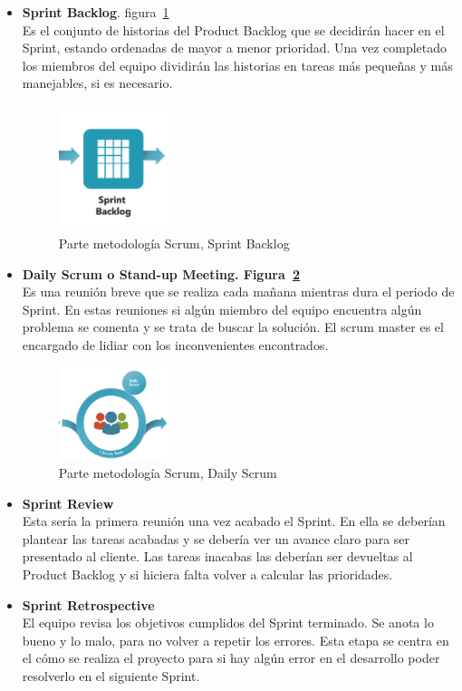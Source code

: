 \begin{itemize}
\item \textbf{Sprint Backlog}. figura~\ref{fig:sprint}\\
Es el conjunto de historias del Product Backlog que se decidirán hacer en el Sprint, estando ordenadas de mayor a menor prioridad. Una vez completado los miembros del equipo dividirán las historias en tareas más pequeñas y más manejables, si es necesario.

\begin{figure}[H]
		\centering
		\includegraphics[width=0.3\textwidth] {sprint.png}
		\caption{Parte metodología Scrum, Sprint Backlog }\label{fig:sprint}
	\end{figure} 

 
 
\item \textbf{Daily Scrum o Stand-up Meeting. Figura~\ref{fig:daily}}\\
Es una reunión breve que se realiza cada mañana mientras dura el periodo de Sprint. 
En estas reuniones si algún miembro del equipo encuentra algún problema  se comenta y se trata de buscar la solución. El scrum master es el encargado de lidiar con los inconvenientes encontrados.

\begin{figure}[H]
		\centering
		\includegraphics[width=0.3\textwidth] {daily.png}
		\caption{Parte metodología Scrum, Daily Scrum }\label{fig:daily}
	\end{figure} 

\item\textbf{ Sprint Review}\\
Esta sería la primera reunión una vez acabado el Sprint. En ella se deberían plantear las tareas acabadas y se debería ver un avance claro para ser presentado al cliente. Las tareas inacabas las deberían ser devueltas al Product Backlog y si hiciera falta volver a calcular las prioridades.

 \item \textbf{Sprint Retrospective}\\
  El equipo revisa los objetivos cumplidos del Sprint terminado. Se anota lo bueno y lo malo, para no volver a repetir los errores. Esta etapa se centra en el cómo se realiza el proyecto para si hay algún error en el desarrollo poder resolverlo en el siguiente Sprint.
\end{itemize}




